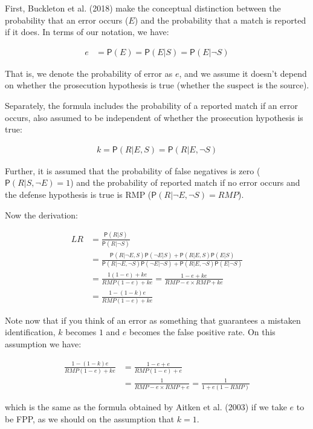 \documentclass[10pt,dvipsnames,enabledeprecatedfontcommands]{scrartcl}
\newcommand{\n}{\neg}
\newcommand{\pr}[1]{\mathsf{P}(#1)}
\begin{document}
First, Buckleton et al. (2018) make the conceptual distinction between
the probability that an error occurs (\(E\)) and the probability that a
match is reported if it does. In terms of our notation, we have:

\begin{align*}
e & = \pr{E} = \pr{E \vert S} = \pr{E \vert \n S}
\end{align*}

\noindent That is, we denote the probability of error as \(e\), and we
assume it doesn't depend on whether the prosecution hypothesis is true
(whether the suspect is the source).

Separately, the formula includes the probability of a reported match if
an error occurs, also assumed to be independent of whether the
prosecution hypothesis is true:

\begin{align*}
k =  \pr{R \vert E, S} = \pr{R \vert E, \n S}
\end{align*}

\noindent Further, it is assumed that the probability of false negatives
is zero (\(\pr{R \vert S, \n E} =1\)) and the probability of reported
match if no error occurs and the defense hypothesis is true is RMP
(\(\pr{R \vert \n E, \n S}=RMP\)).

Now the derivation:

\begin{align*}
LR & = \frac{\pr{R\vert S}}
{\pr{R \vert \n S}}\\
& = \frac{\pr{R \vert \n E, S}\pr{\n E \vert S} + \pr{R \vert E, S}\pr{E \vert S}}
{\pr{R \vert \n E, \n S}\pr {\n E \vert \n S} + \pr{R \vert E, \n S}\pr{E \vert \n S}}\\
& = \frac{1(1-e) + ke}
{RMP(1-e)+ke}  = \frac{1-e+ke}{RMP  - e\times RMP + ke} \\
& = \frac{1 - (1-k)e}{RMP(1-e)+ke}
\end{align*}

Note now that if you think of an error as something that guarantees a
mistaken identification, \(k\) becomes \(1\) and \(e\) becomes the false
positive rate. On this assumption we have:

\begin{align*}
 \frac{1 - (1-k)e}{RMP(1-e)+ke} & = \frac{1-e+e}{RMP(1-e)+e}\\
 & = \frac{1}{RMP - e\times RMP + e} = \frac{1}{1 + e(1-RMP)}
\end{align*}

\noindent which is the same as the formula obtained by Aitken et al.
(2003) if we take \(e\) to be FPP, as we should on the assumption that
\(k=1\).
\end{document}
